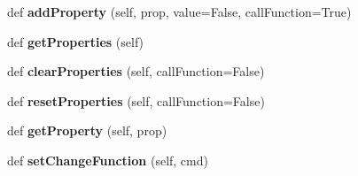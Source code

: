 \begin{DoxyCompactItemize}
def {\bfseries add\+Property} (self, prop, value=False, call\+Function=True)
\item 
\mbox{\label{class_python_01_g_u_i_1_1appjar_1_1_properties_ab3463eddc45dfefd812c724bcc0659f1}} 
def {\bfseries get\+Properties} (self)
\item 
\mbox{\label{class_python_01_g_u_i_1_1appjar_1_1_properties_a86e402872c55000094c5c3e08b4dc078}} 
def {\bfseries clear\+Properties} (self, call\+Function=False)
\item 
\mbox{\label{class_python_01_g_u_i_1_1appjar_1_1_properties_a7a192750d2f876123b1a01b0590da1e1}} 
def {\bfseries reset\+Properties} (self, call\+Function=False)
\item 
\mbox{\label{class_python_01_g_u_i_1_1appjar_1_1_properties_a440963b17743fe26901779ad4ff7afab}} 
def {\bfseries get\+Property} (self, prop)
\item 
\mbox{\label{class_python_01_g_u_i_1_1appjar_1_1_properties_a54ca634033c93c092600a8ca1e7f5a79}} 
def {\bfseries set\+Change\+Function} (self, cmd)
\end{DoxyCompactItemize}
